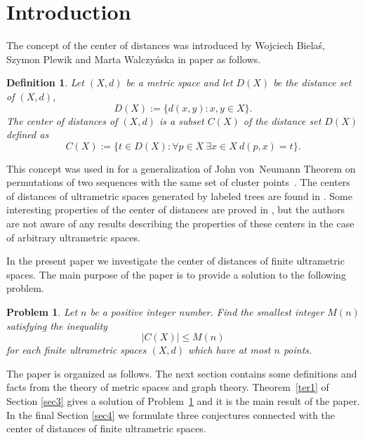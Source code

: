 \documentclass[pdflatex,sn-mathphys-num]{sn-jnl}%
\theoremstyle{thmstyleone}%
\newtheorem{Problem}[Theorem]{Problem}
\theoremstyle{thmstyletwo}%
\theoremstyle{thmstylethree}%
\newtheorem{Definition}[Theorem]{Definition}
\theoremstyle{thmstyletwo}%
\theoremstyle{thmstylethree}%
\begin{document}
\section{Introduction}



The concept of the center of distances was introduced by Wojciech Bielaś, Szymon Plewik and Marta Walczyńska in paper \cite{BPW2018} as follows.
\begin{Definition}\label{zcgh572}
Let $(X,d)$ be a metric space and let $D(X)$ be the distance set of $(X,d)$,
\[
D(X) := \{ d(x,y) : x,y \in X \}.
\]
The {\it center of distances} of $(X,d)$ is a subset $C(X)$ of the {\it distance set} $D(X)$
 defined as
\begin{equation}
    \label{edft34Gb}
C(X):=\{t \in D(X) : \forall p\in X\ \exists x\in X\ d(p,x)=t\}.
\end{equation}
\end{Definition}
 This concept was used in \cite{BPW2018} for a generalization of John von~Neumann Theorem on permutations of two sequences with the same set of cluster points~\cite{Neumann1935}. The centers of
distances of ultrametric
spaces generated by labeled trees are found in \cite{DR2026MDPI}.
Some interesting properties of the center of distances are proved in \cite{Bartoszewicz2018-1,Bartoszewicz2018,Banakiewicz2023,Kula2024Achievement,NPT2025}, but the authors are not aware of any results describing the properties of these centers in the case of arbitrary ultrametric  spaces.

In the present paper we investigate the center of distances of finite ultrametric spaces. 
The main purpose of the paper is to provide  a solution to the following problem.
\begin{Problem}\label{pr1}
Let $n$ be a positive integer number. Find the smallest integer $M(n)$ satisfying the inequality
\[
|C(X)| \leq M(n)
\]
for each finite ultrametric spaces $(X,d)$ which have at most $n$ points.
\end{Problem}


The paper is organized as follows. The next section contains some definitions and facts from the theory of metric spaces and graph theory. Theorem~\ref{ter1} of Section \ref{sec3} gives a solution of Problem~\ref{pr1} and it is the main result of the paper. In the final Section \ref{sec4} we formulate three conjectures connected with the center of distances of finite ultrametric spaces.
\end{document}
